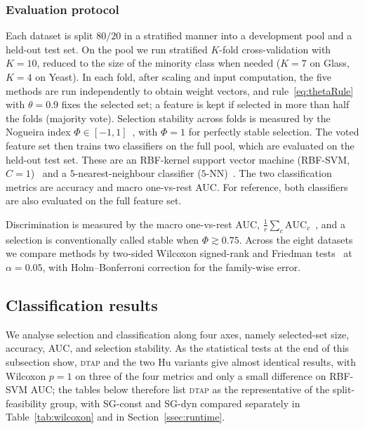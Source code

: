 \documentclass[]{interact}
\theoremstyle{plain}
\theoremstyle{definition}
\theoremstyle{remark}
\newcommand{\dtap}{\textsc{dtap}}
\begin{document}
\subsubsection{Evaluation protocol}\label{sssec:protocol}
Each dataset is split $80/20$ in a stratified manner into a development pool and a held-out test set. On the pool we run stratified $K$-fold cross-validation with $K=10$, reduced to the size of the minority class when needed ($K=7$ on Glass, $K=4$ on Yeast). In each fold, after scaling and input computation, the five methods are run independently to obtain weight vectors, and rule~\eqref{eq:thetaRule} with $\theta=0.9$ fixes the selected set; a feature is kept if selected in more than half the folds (majority vote). Selection stability across folds is measured by the Nogueira index $\Phi\in[-1,1]$~\citep{nogueira2018}, with $\Phi=1$ for perfectly stable selection. The voted feature set then trains two classifiers on the full pool, which are evaluated on the held-out test set. These are an RBF-kernel support vector machine (RBF-SVM, $C=1$)~\citep{cortes1995svm} and a $5$-nearest-neighbour classifier ($5$-NN)~\citep{cover1967knn}. The two classification metrics are accuracy and macro one-vs-rest AUC. For reference, both classifiers are also evaluated on the full feature set.

Discrimination is measured by the macro one-vs-rest AUC, $\tfrac1r\sum_{c}\mathrm{AUC}_c$~\citep{handtill2001}, and a selection is conventionally called stable when $\Phi\gtrsim0.75$. Across the eight datasets we compare methods by two-sided Wilcoxon signed-rank and Friedman tests~\citep{demsar2006} at $\alpha=0.05$, with Holm--Bonferroni correction for the family-wise error.

\subsection{Classification results}\label{ssec:results}
We analyse selection and classification along four axes, namely selected-set size, accuracy, AUC, and selection stability. As the statistical tests at the end of this subsection show, \dtap{} and the two Hu variants give almost identical results, with Wilcoxon $p=1$ on three of the four metrics and only a small difference on RBF-SVM AUC; the tables below therefore list \dtap{} as the representative of the split-feasibility group, with SG-const and SG-dyn compared separately in Table~\ref{tab:wilcoxon} and in Section~\ref{ssec:runtime}.
\end{document}
